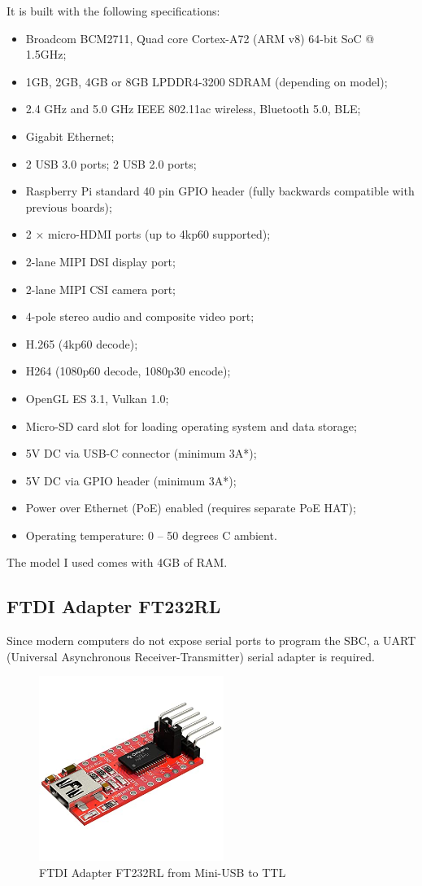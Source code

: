 \documentclass[a4paper, 12pt]{article}
\begin{document}
It is built with the following specifications\cite{SpecsRpi4}:
\begin{itemize}
    \item Broadcom BCM2711, Quad core Cortex-A72 (ARM v8) 64-bit SoC @ 1.5GHz;
    \item 1GB, 2GB, 4GB or 8GB LPDDR4-3200 SDRAM (depending on model);
    \item 2.4 GHz and 5.0 GHz IEEE 802.11ac wireless, Bluetooth 5.0, BLE;
    \item Gigabit Ethernet;
    \item 2 USB 3.0 ports; 2 USB 2.0 ports;
    \item Raspberry Pi standard 40 pin GPIO header (fully backwards compatible with previous boards);
    \item 2 × micro-HDMI ports (up to 4kp60 supported);
    \item 2-lane MIPI DSI display port;
    \item 2-lane MIPI CSI camera port;
    \item 4-pole stereo audio and composite video port;
    \item H.265 (4kp60 decode);
    \item H264 (1080p60 decode, 1080p30 encode);
    \item OpenGL ES 3.1, Vulkan 1.0;
    \item Micro-SD card slot for loading operating system and data storage;
    \item 5V DC via USB-C connector (minimum 3A*);
    \item 5V DC via GPIO header (minimum 3A*);
    \item Power over Ethernet (PoE) enabled (requires separate PoE HAT);
    \item Operating temperature: 0 – 50 degrees C ambient.
\end{itemize}
The model I used comes with 4GB of RAM.

\subsection{FTDI Adapter FT232RL}
Since modern computers do not expose serial ports to program the SBC, a UART (Universal Asynchronous Receiver-Transmitter) serial adapter is required. 

\begin{figure}[h]
    \includegraphics[width=6cm]{FT232-AZ}
    \centering
    \caption{FTDI Adapter FT232RL from Mini-USB to TTL}
\end{figure}
\end{document}

